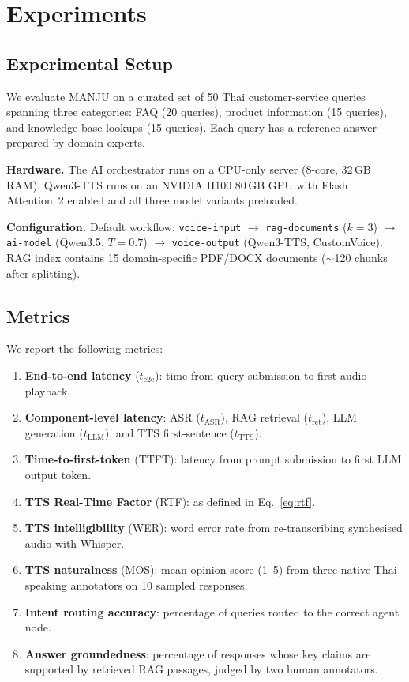 \documentclass[10pt, a4paper, twocolumn]{article}
\begin{document}
\section{Experiments}
\label{sec:experiments}

\subsection{Experimental Setup}

We evaluate MANJU on a curated set of 50 Thai customer-service queries spanning three categories: FAQ (20 queries), product information (15 queries), and knowledge-base lookups (15 queries).
Each query has a reference answer prepared by domain experts.

\noindent\textbf{Hardware.}
The AI orchestrator runs on a CPU-only server (8-core, 32\,GB RAM).
Qwen3-TTS runs on an NVIDIA H100 80\,GB GPU with Flash Attention~2 enabled and all three model variants preloaded.

\noindent\textbf{Configuration.}
Default workflow: \texttt{voice-input} $\rightarrow$ \texttt{rag-documents} ($k{=}3$) $\rightarrow$ \texttt{ai-model} (Qwen3.5, $T{=}0.7$) $\rightarrow$ \texttt{voice-output} (Qwen3-TTS, CustomVoice).
RAG index contains 15 domain-specific PDF/DOCX documents (${\sim}$120 chunks after splitting).

\subsection{Metrics}

We report the following metrics:
\begin{enumerate}[label=(\roman*), nosep]
    \item \textbf{End-to-end latency} ($t_\text{e2e}$): time from query submission to first audio playback.
    \item \textbf{Component-level latency}: ASR ($t_\text{ASR}$), RAG retrieval ($t_\text{ret}$), LLM generation ($t_\text{LLM}$), and TTS first-sentence ($t_\text{TTS}$).
    \item \textbf{Time-to-first-token} (TTFT): latency from prompt submission to first LLM output token.
    \item \textbf{TTS Real-Time Factor} (RTF): as defined in Eq.~\eqref{eq:rtf}.
    \item \textbf{TTS intelligibility} (WER): word error rate from re-transcribing synthesised audio with Whisper.
    \item \textbf{TTS naturalness} (MOS): mean opinion score (1--5) from three native Thai-speaking annotators on 10 sampled responses.
    \item \textbf{Intent routing accuracy}: percentage of queries routed to the correct agent node.
    \item \textbf{Answer groundedness}: percentage of responses whose key claims are supported by retrieved RAG passages, judged by two human annotators.
\end{enumerate}
\end{document}
